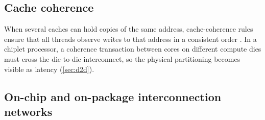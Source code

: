 \subsection{Cache coherence}
When several caches can hold copies of the same address, \gls{cache-coherence} rules ensure that all threads observe writes to that address in a consistent order \cite[sec.~12.4.2]{sarangi2025basic}. In a chiplet processor, a coherence transaction between cores on different compute dies must cross the die-to-die interconnect, so the physical partitioning becomes visible as latency (\cref{sec:d2d}).


\subsection{On-chip and on-package interconnection networks}
